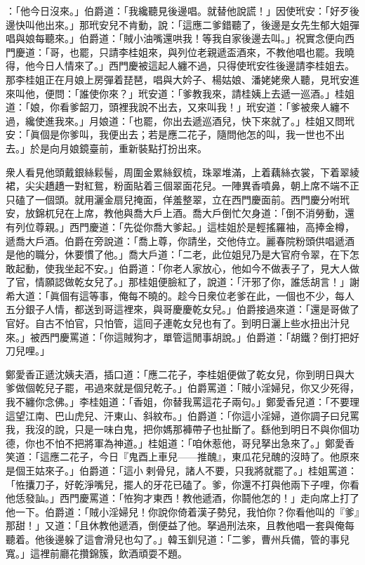 ：「他今日沒來。」伯爵道：「我纔聽見後邊唱。就替他說謊！」因使玳安：「好歹後邊快叫他出來。」那玳安兒不肯動，說：「這應二爹錯聽了，後邊是女先生郁大姐彈唱與娘每聽來。」伯爵道：「賊小油嘴還哄我！等我自家後邊去叫。」祝實念便向西門慶道：「哥，也罷，只請李桂姐來，與列位老親遞盃酒來，不教他唱也罷。我曉得，他今日人情來了。」西門慶被這起人纏不過，只得使玳安徃後邊請李桂姐去。那李桂姐正在月娘上房彈着琵琶，唱與大妗子、楊姑娘、潘姥姥衆人聽，見玳安進來叫他，便問：「誰使你來？」玳安道：「爹教我來，請桂姨上去遞一巡酒。」桂姐道：「娘，你看爹韶刀，頭裡我說不出去，又來叫我！」玳安道：「爹被衆人纏不過，纔使進我來。」月娘道：「也罷，你出去遞巡酒兒，快下來就了。」桂姐又問玳安：「眞個是你爹叫，我便出去；若是應二花子，隨問他怎的叫，我一世也不出去。」於是向月娘鏡臺前，重新裝點打扮出來。

衆人看見他頭戴銀絲鬏髻，周圍金累絲釵梳，珠翠堆滿，上着藕絲衣裳，下着翠綾裙，尖尖趫趫一對紅鴛，粉面貼着三個翠面花兒。一陣異香噴鼻，朝上席不端不正只磕了一個頭。就用灑金扇兒掩面，佯羞整翠，立在西門慶面前。西門慶分咐玳安，放錦杌兒在上席，教他與喬大戶上酒。喬大戶倒忙欠身道：「倒不消勞動，還有列位尊親。」西門慶道：「先從你喬大爹起。」這桂姐於是輕搖羅袖，高捧金樽，遞喬大戶酒。伯爵在旁說道：「喬上尊，你請坐，交他侍立。麗春院粉頭供唱遞酒是他的職分，休要慣了他。」喬大戶道：「二老，此位姐兒乃是大官府令翠，在下怎敢起動，使我坐起不安。」伯爵道：「你老人家放心，他如今不做表子了，見大人做了官，情願認做乾女兒了。」那桂姐便臉紅了，說道：「汗邪了你，誰恁胡言！」謝希大道：「眞個有這等事，俺每不曉的。趁今日衆位老爹在此，一個也不少，每人五分銀子人情，都送到哥這裡來，與哥慶慶乾女兒。」{}伯爵接過來道：「還是哥做了官好。自古不怕官，只怕管，這囘子連乾女兒也有了。到明日灑上些水扭出汁兒來。」被西門慶罵道：「你這賊狗才，單管這閒事胡說。」伯爵道：「胡鐵？倒打把好刀兒哩。」

鄭愛香正遞沈姨夫酒，插口道：「應二花子，李桂姐便做了乾女兒，你到明日與大爹做個乾兒子罷，弔過來就是個兒乾子。」伯爵罵道：「賊小淫婦兒，你又少死得，我不纏你念佛。」李桂姐道：「香姐，你替我罵這花子兩句。」鄭愛香兒道：「不要理這望江南、巴山虎兒、汗東山、斜紋布。」{}伯爵道：「你這小淫婦，道你調子曰兒罵我，我沒的說，只是一味白鬼，把你媽那褲帶子也扯斷了。繇他到明日不與你個功德，你也不怕不把將軍為神道。」桂姐道：「咱休惹他，哥兒拏出急來了。」鄭愛香笑道：「這應二花子，今日『鬼酉上車兒——推醜』，東瓜花兒醜的沒時了。他原來是個王姑來子。」伯爵道：「這小𢱉剌骨兒，諸人不要，只我將就罷了。」桂姐罵道：「恠攮刀子，好乾淨嘴兒，擺人的牙花已磕了。爹，你還不打與他兩下子哩，你看他恁發訕。」西門慶罵道：「恠狗才東西！教他遞酒，你鬪他怎的！」走向席上打了他一下。伯爵道：「賊小淫婦兒！你說你倚着漢子勢兒，我怕你？你看他叫的『爹』那甜！」又道：「且休教他遞酒，倒便益了他。拏過刑法來，且教他唱一套與俺每聽着。他後邊躲了這會滑兒也勾了。」韓玉釧兒道：「二爹，曹州兵備，管的事兒寬。」這裡前廳花攢錦簇，飲酒頑耍不題。

